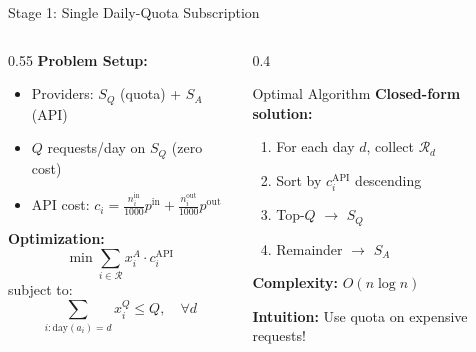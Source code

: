 \documentclass[aspectratio=169,10pt]{beamer}
\begin{document}
\begin{frame}{Stage 1: Single Daily-Quota Subscription}
\begin{columns}[T]
\begin{column}{0.55\textwidth}
\textbf{Problem Setup:}
\begin{itemize}
    \item Providers: $S_Q$ (quota) + $S_A$ (API)
    \item $Q$ requests/day on $S_Q$ (zero cost)
    \item API cost: $c_i = \frac{n_i^{\text{in}}}{1000} p^{\text{in}} + \frac{n_i^{\text{out}}}{1000} p^{\text{out}}$
\end{itemize}

\vspace{0.3cm}
\textbf{Optimization:}
\begin{equation*}
\min \sum_{i \in \mathcal{R}} x_i^A \cdot c_i^{\text{API}}
\end{equation*}
subject to:
\begin{equation*}
\sum_{i: \text{day}(a_i)=d} x_i^Q \leq Q, \quad \forall d
\end{equation*}

\end{column}

\begin{column}{0.4\textwidth}
\begin{block}{Optimal Algorithm}
\textbf{Closed-form solution:}
\begin{enumerate}
    \item For each day $d$, collect $\mathcal{R}_d$
    \item Sort by $c_i^{\text{API}}$ descending
    \item Top-$Q$ $\rightarrow$ $S_Q$
    \item Remainder $\rightarrow$ $S_A$
\end{enumerate}
\end{block}

\vspace{0.3cm}
\textcolor{icmlgreen}{\textbf{Complexity:}} $O(n \log n)$

\vspace{0.2cm}
\textcolor{icmlblue}{\textbf{Intuition:}} Use quota on expensive requests!
\end{column}
\end{columns}
\end{frame}
\end{document}
